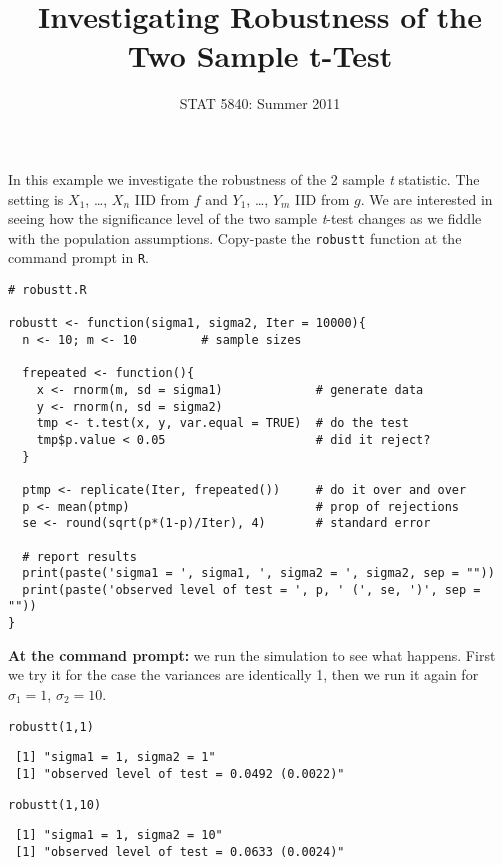 \documentclass[11pt,english]{article}
\title{Investigating Robustness of the Two Sample t-Test}
\date{STAT 5840: Summer 2011}
\begin{document}
\maketitle

\thispagestyle{empty}

In this example we investigate the robustness of the 2 sample \emph{t} statistic.  The setting is $X_{1}$, \ldots{}, $X_{n}$ IID from $f$ and $Y_{1}$, \ldots{}, $Y_{m}$ IID from $g$.  We are interested in seeing how the significance level of the two sample \emph{t}-test changes as we fiddle with the population assumptions.  Copy-paste the \texttt{robustt} function at the command prompt in \texttt{R}.

\begin{verbatim}
# robustt.R

robustt <- function(sigma1, sigma2, Iter = 10000){
  n <- 10; m <- 10         # sample sizes

  frepeated <- function(){
    x <- rnorm(m, sd = sigma1)             # generate data
    y <- rnorm(n, sd = sigma2)  
    tmp <- t.test(x, y, var.equal = TRUE)  # do the test
    tmp$p.value < 0.05                     # did it reject? 
  }

  ptmp <- replicate(Iter, frepeated())     # do it over and over
  p <- mean(ptmp)                          # prop of rejections
  se <- round(sqrt(p*(1-p)/Iter), 4)       # standard error
  
  # report results
  print(paste('sigma1 = ', sigma1, ', sigma2 = ', sigma2, sep = ""))
  print(paste('observed level of test = ', p, ' (', se, ')', sep = ""))
}
\end{verbatim}





\bigskip
\noindent

\textbf{At the command prompt:} we run the simulation to see what happens.  First we try it for the case the variances are identically 1, then we run it again for $\sigma_{1} = 1$, $\sigma_{2} = 10$.


\begin{verbatim}
robustt(1,1)
\end{verbatim}




\begin{verbatim}
 [1] "sigma1 = 1, sigma2 = 1"
 [1] "observed level of test = 0.0492 (0.0022)"
\end{verbatim}



\begin{verbatim}
robustt(1,10)
\end{verbatim}




\begin{verbatim}
 [1] "sigma1 = 1, sigma2 = 10"
 [1] "observed level of test = 0.0633 (0.0024)"
\end{verbatim}
\end{document}
